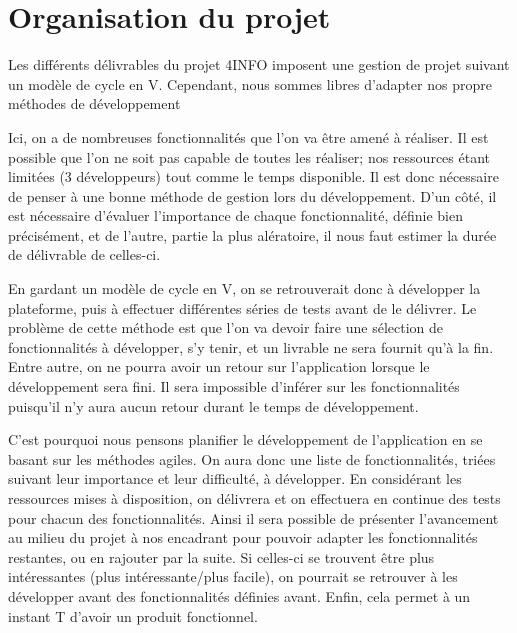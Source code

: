 \section{Organisation du projet}
\label{sec:orga}

	Les différents délivrables du projet 4INFO imposent une gestion de projet suivant un modèle de cycle en V. Cependant, nous sommes libres d'adapter nos propre méthodes de développement 

	Ici, on a de nombreuses fonctionnalités que l'on va être amené à réaliser. Il est possible que l'on ne soit pas capable de toutes les réaliser; nos ressources étant limitées (3 développeurs) tout comme le temps disponible. Il est donc nécessaire de penser à une bonne méthode de gestion lors du développement. D'un côté, il est nécessaire d'évaluer l'importance de chaque fonctionnalité, définie bien précisément, et de l'autre, partie la plus alératoire, il nous faut estimer la durée de délivrable de celles-ci.

	En gardant un modèle de cycle en V, on se retrouverait donc à développer la plateforme, puis à effectuer différentes séries de tests avant de le délivrer. Le problème de cette méthode est que l'on va devoir faire une sélection de fonctionnalités à développer, s'y tenir, et un livrable ne sera fournit qu'à la fin. Entre autre, on ne pourra avoir un retour sur l'application lorsque le développement sera fini. Il sera impossible d'inférer sur les fonctionnalités puisqu'il n'y aura aucun retour durant le temps de développement. 

	C'est pourquoi nous pensons planifier le développement de l'application en se basant sur les méthodes agiles. On aura donc une liste de fonctionnalités, triées suivant leur importance et leur difficulté, à développer. En considérant les ressources mises à disposition, on délivrera et on effectuera en continue des tests pour chacun des fonctionnalités. Ainsi il sera possible de présenter l'avancement au milieu du projet à nos encadrant pour pouvoir adapter les fonctionnalités restantes, ou en rajouter par la suite. Si celles-ci se trouvent être plus intéressantes (plus intéressante/plus facile), on pourrait se retrouver à les développer avant des fonctionnalités définies avant. Enfin, cela permet à un instant T d'avoir un produit fonctionnel.